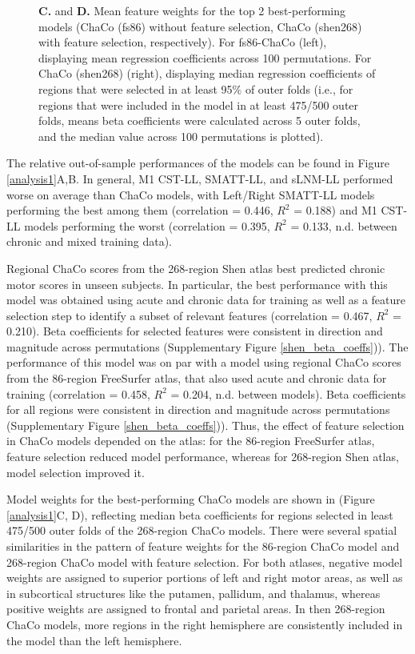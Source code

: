 \documentclass[phd,tocprelim]{cornell}
\begin{document}
\begin{figure}[htp]
{\textbf{C.} and \textbf{D.} Mean feature weights for the top 2 best-performing models (ChaCo (fs86) without feature selection, ChaCo (shen268) with feature selection, respectively). For fs86-ChaCo (left), displaying mean regression coefficients across 100 permutations. For ChaCo (shen268) (right), displaying median regression coefficients of regions that were selected in at least 95$\%$ of outer folds (i.e., for regions that were included in the model in at least 475/500 outer folds, means beta coefficients were calculated across 5 outer folds, and the median value across 100 permutations is plotted). }
\label{Figure3_1}
\end{figure}

The relative out-of-sample performances of the models can be found in Figure \ref{analysis1}A,B. In general, M1 CST-LL, SMATT-LL, and sLNM-LL performed worse on average than ChaCo models, with Left/Right SMATT-LL models performing the best among them (correlation = 0.446, $R^2$ = 0.188) and M1 CST-LL models performing the worst (correlation = 0.395, $R^2$ = 0.133, n.d. between chronic and mixed training data). 

Regional ChaCo scores from the 268-region Shen atlas best predicted chronic motor scores in unseen subjects. In particular, the best performance with this model was obtained using acute and chronic data for training as well as a feature selection step to identify a subset of relevant features (correlation = 0.467, $R^2$ = 0.210). Beta coefficients for selected features were consistent in direction and magnitude across permutations (Supplementary Figure \ref{shen_beta_coeffs})). The performance of this model was on par with a model using regional ChaCo scores from the 86-region FreeSurfer atlas, that also used acute and chronic data for training (correlation = 0.458, $R^2$ = 0.204, n.d. between models). Beta coefficients for all regions were consistent in direction and magnitude across permutations (Supplementary Figure  \ref{shen_beta_coeffs})).  Thus, the effect of feature selection in ChaCo models depended on the atlas: for the 86-region FreeSurfer atlas, feature selection reduced model performance, whereas for 268-region Shen atlas, model selection improved it. 

Model weights for the best-performing ChaCo models are shown in (Figure \ref{analysis1}C, D), reflecting median beta coefficients for regions selected in least 475/500 outer folds of the 268-region ChaCo models. There were several spatial similarities in the pattern of feature weights for the 86-region ChaCo model and 268-region ChaCo model with feature selection. For both atlases, negative model weights are assigned to superior portions of left and right motor areas, as well as in subcortical structures like the putamen, pallidum, and thalamus, whereas positive weights are assigned to frontal and parietal areas. In then 268-region ChaCo models, more regions in the right hemisphere are consistently included in the model than the left hemisphere. 
\end{document}
